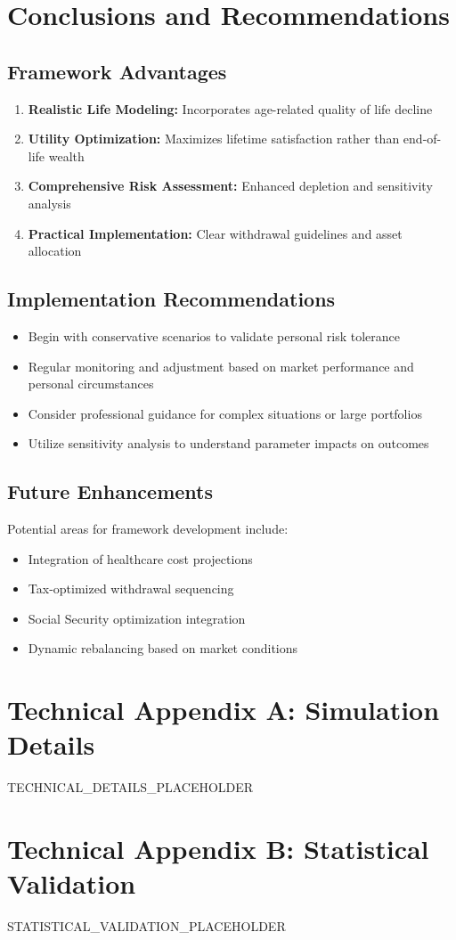 \documentclass[11pt,a4paper]{article}
\begin{document}
\section{Conclusions and Recommendations}

\subsection{Framework Advantages}
\begin{enumerate}
    \item \textbf{Realistic Life Modeling:} Incorporates age-related quality of life decline
    \item \textbf{Utility Optimization:} Maximizes lifetime satisfaction rather than end-of-life wealth
    \item \textbf{Comprehensive Risk Assessment:} Enhanced depletion and sensitivity analysis
    \item \textbf{Practical Implementation:} Clear withdrawal guidelines and asset allocation
\end{enumerate}

\subsection{Implementation Recommendations}
\begin{itemize}
    \item Begin with conservative scenarios to validate personal risk tolerance
    \item Regular monitoring and adjustment based on market performance and personal circumstances
    \item Consider professional guidance for complex situations or large portfolios
    \item Utilize sensitivity analysis to understand parameter impacts on outcomes
\end{itemize}

\subsection{Future Enhancements}
Potential areas for framework development include:
\begin{itemize}
    \item Integration of healthcare cost projections
    \item Tax-optimized withdrawal sequencing
    \item Social Security optimization integration  
    \item Dynamic rebalancing based on market conditions
\end{itemize}

\appendix

\section{Technical Appendix A: Simulation Details}
TECHNICAL_DETAILS_PLACEHOLDER

\section{Technical Appendix B: Statistical Validation}
STATISTICAL_VALIDATION_PLACEHOLDER
\end{document}
